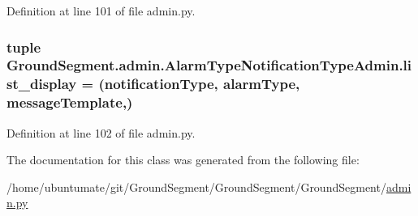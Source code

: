 Definition at line 101 of file admin.\+py.

\hypertarget{class_ground_segment_1_1admin_1_1_alarm_type_notification_type_admin_ac52ed410fef4e7f5105e37235b7453ee}{}
\subsubsection[{list\+\_\+display}]{\setlength{\rightskip}{0pt plus 5cm}tuple Ground\+Segment.\+admin.\+Alarm\+Type\+Notification\+Type\+Admin.\+list\+\_\+display = (\textquotesingle{}notification\+Type\textquotesingle{}, \textquotesingle{}alarm\+Type\textquotesingle{}, \textquotesingle{}message\+Template\textquotesingle{},)\hspace{0.3cm}{\ttfamily [static]}}\label{class_ground_segment_1_1admin_1_1_alarm_type_notification_type_admin_ac52ed410fef4e7f5105e37235b7453ee}


Definition at line 102 of file admin.\+py.



The documentation for this class was generated from the following file\+:\begin{DoxyCompactItemize}
\item 
/home/ubuntumate/git/\+Ground\+Segment/\+Ground\+Segment/\+Ground\+Segment/\hyperlink{admin_8py}{admin.\+py}\end{DoxyCompactItemize}
